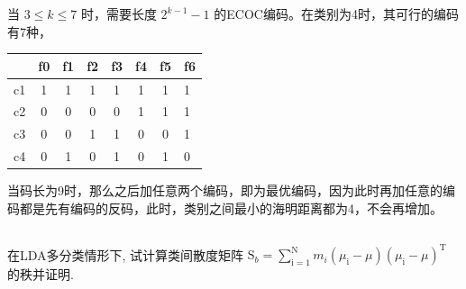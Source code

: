 \documentclass[UTF8,a4paper,AutoFakeBold,AutoFakeSlant]{article}
\begin{document}
当 $3 \leq k \leq 7$ 时，需要长度 $2^{k-1}-1$ 的ECOC编码。在类别为4时，其可行的编码有7种，

\begin{table}[htbp]
  \centering
  \begin{tabular}{|l|ccccccl|}
    \toprule
       & f0 & f1 & f2 & f3 & f4 & f5 & f6 \\
    \midrule
    c1 & 1  & 1  & 1  & 1  & 1  & 1  & 1  \\
    c2 & 0  & 0  & 0  & 0  & 1  & 1  & 1  \\
    c3 & 0  & 0  & 1  & 1  & 0  & 0  & 1  \\
    c4 & 0  & 1  & 0  & 1  & 0  & 1  & 0  \\
    \bottomrule
  \end{tabular}%
  \label{tab:addlabel}%
\end{table}%
当码长为9时，那么之后加任意两个编码，即为最优编码，因为此时再加任意的编码都是先有编码的反码，此时，类别之间最小的海明距离都为4，不会再增加。



\subsection{}
在LDA多分类情形下, 试计算类间散度矩阵 $\mathrm{S}_{b}=\sum_{\mathrm{i}=1}^{\mathrm{N}} m_i\left(\mu_{\mathrm{i}}-\mu\right)\left(\mu_{\mathrm{i}}-\mu\right)^{\mathrm{T}}$ 的秩并证明.
\end{document}
